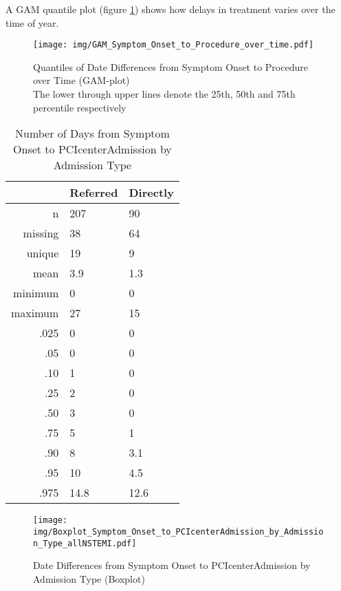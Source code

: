 \documentclass[presentation,xcolor=pdftex,dvipsnames,table,11pt]{beamer}
\begin{document}
\begin{tiny}
\begin{frame}
A GAM quantile plot (figure \ref{GAM: Date Differences from Symptom Onset to Procedure over Time}) shows how delays in treatment varies over the time of year.

\begin{figure}
  \centering
  \caption{Quantiles of Date Differences from Symptom Onset to Procedure over Time (GAM-plot)\\
  The lower through upper lines denote the 25th, 50th and 75th percentile respectively}
  \label{GAM: Date Differences from Symptom Onset to Procedure over Time}
\texttt{[image: img/GAM\_Symptom\_Onset\_to\_Procedure\_over\_time.pdf]}\end{figure}
\end{frame}






\begin{frame}

\begin{table}[ht]
\centering
\begin{tabular}{rll}
  \toprule
 & Referred & Directly \\ 
  \midrule
n & 207 & 90 \\ 
  missing & 38 & 64 \\ 
  unique & 19 & 9 \\ 
  mean & 3.9 & 1.3 \\ 
  minimum & 0 & 0 \\ 
  maximum & 27 & 15 \\ 
  .025 & 0 & 0 \\ 
  .05 & 0 & 0 \\ 
  .10 & 1 & 0 \\ 
  .25 & 2 & 0 \\ 
  .50 & 3 & 0 \\ 
  .75 & 5 & 1 \\ 
  .90 & 8 & 3.1 \\ 
  .95 & 10 & 4.5 \\ 
  .975 & 14.8 & 12.6 \\ 
   \bottomrule
\end{tabular}
\caption{Number of Days from Symptom Onset to PCIcenterAdmission by Admission Type} 
\end{table}\end{frame}


\begin{frame}
\begin{figure}
  \centering
  \caption{Date Differences from Symptom Onset to PCIcenterAdmission by Admission Type (Boxplot)}
  \label{Boxplot: Date Differences from Symptom Onset to PCIcenterAdmission by Admission Type}
\texttt{[image: img/Boxplot\_Symptom\_Onset\_to\_PCIcenterAdmission\_by\_Admission\_Type\_allNSTEMI.pdf]}\end{figure}
\end{frame}



\end{tiny}
\end{document}
